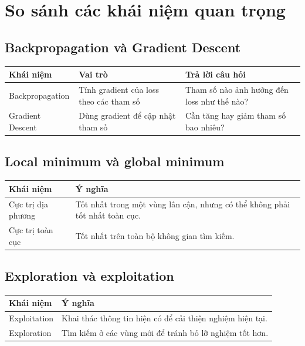 \section{So sánh các khái niệm quan trọng}

\subsection{Backpropagation và Gradient Descent}

\begin{center}
\begin{tabular}{p{}p{}p{}}
\toprule
Khái niệm & Vai trò & Trả lời câu hỏi \\
\midrule
Backpropagation & Tính gradient của loss theo các tham số & Tham số nào ảnh hưởng đến loss như thế nào? \\
Gradient Descent & Dùng gradient để cập nhật tham số & Cần tăng hay giảm tham số bao nhiêu? \\
\bottomrule
\end{tabular}
\end{center}

\subsection{Local minimum và global minimum}

\begin{center}
\begin{tabular}{p{}p{}}
\toprule
Khái niệm & Ý nghĩa \\
\midrule
Cực trị địa phương & Tốt nhất trong một vùng lân cận, nhưng có thể không phải tốt nhất toàn cục. \\
Cực trị toàn cục & Tốt nhất trên toàn bộ không gian tìm kiếm. \\
\bottomrule
\end{tabular}
\end{center}

\subsection{Exploration và exploitation}

\begin{center}
\begin{tabular}{p{}p{}}
\toprule
Khái niệm & Ý nghĩa \\
\midrule
Exploitation & Khai thác thông tin hiện có để cải thiện nghiệm hiện tại. \\
Exploration & Tìm kiếm ở các vùng mới để tránh bỏ lỡ nghiệm tốt hơn. \\
\bottomrule
\end{tabular}
\end{center}

